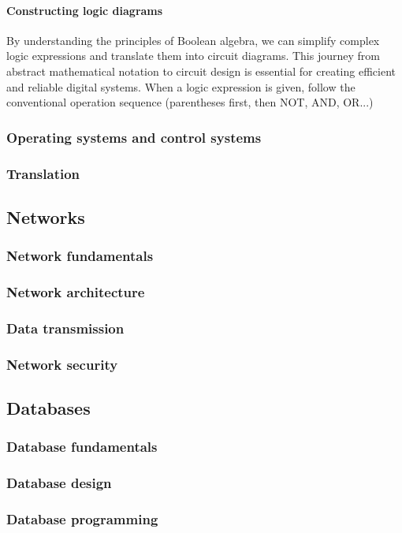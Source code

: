 \documentclass[a4paper,12pt]{article}
\begin{document}
\paragraph{Constructing logic diagrams}
By understanding the principles of Boolean algebra, we can simplify complex logic expressions and translate them into circuit diagrams. This journey from abstract mathematical notation 
to circuit design is essential for creating efficient and reliable digital systems. When a logic expression is given, follow the conventional operation sequence (parentheses first, then NOT, AND, OR...)
\subsubsection{Operating systems and control systems}
\subsubsection{Translation}
\subsection{Networks}
\subsubsection{Network fundamentals}
\subsubsection{Network architecture}
\subsubsection{Data transmission}
\subsubsection{Network security}
\subsection{Databases}
\subsubsection{Database fundamentals}
\subsubsection{Database design}
\subsubsection{Database programming}
\end{document}
